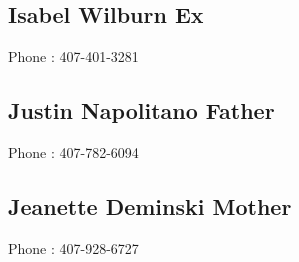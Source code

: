 \documentclass[singlesided, paper=a4, fontsize=10.5pt]{bf-class}
\begin{document}
{    %
    \subsection{Isabel Wilburn  \hfill Ex}
    \begin{zitemize}
    \item Phone : \hfill 407-401-3281
    \end{zitemize}


     \subsection{Justin Napolitano  \hfill Father}
     \begin{zitemize}
     \item Phone : \hfill 407-782-6094
     \end{zitemize}

    \subsection{Jeanette Deminski  \hfill Mother}
    \begin{zitemize}
    \item Phone : \hfill 407-928-6727
    \end{zitemize}
}



\makebody
\end{document}
